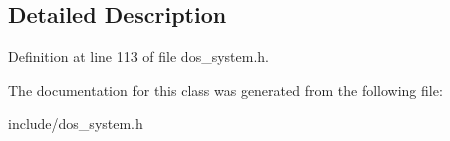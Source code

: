 \subsection{Detailed Description}


Definition at line 113 of file dos\-\_\-system.\-h.



The documentation for this class was generated from the following file\-:\begin{DoxyCompactItemize}
\item 
include/dos\-\_\-system.\-h\end{DoxyCompactItemize}
